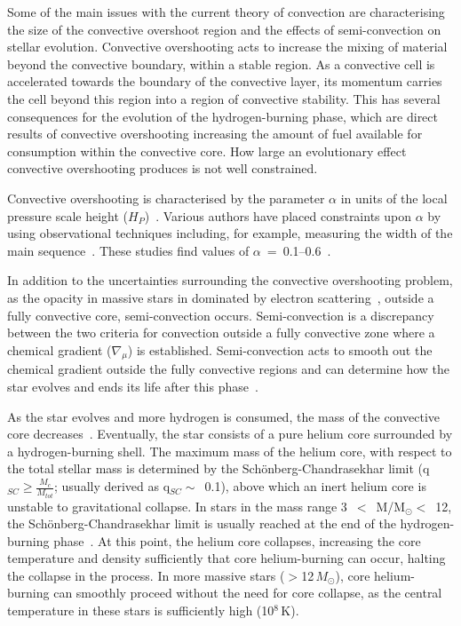 Some of the main issues with the current theory of convection are characterising the size of the convective overshoot region and the effects of semi-convection on stellar evolution.
Convective overshooting acts to increase the mixing of material beyond the convective boundary, within a stable region.
As a convective cell is accelerated towards the boundary of the convective layer, its momentum carries the cell beyond this region into a region of convective stability.
This has several consequences for the evolution of the hydrogen-burning phase, which are direct results of convective overshooting increasing the amount of fuel available for consumption within the convective core.
How large an evolutionary effect convective overshooting produces is not well constrained.

Convective overshooting is characterised by the parameter $\alpha$ in units of the local pressure scale height ($H_{P}$)~\citep{2012sse..book.....K}.
Various authors have placed constraints upon $\alpha$ by using observational techniques including, for example, measuring the width of the main sequence~\citep{Schroder97,Brott11}.
These studies find values of $\alpha$~=~0.1--0.6~\citep[e.g.][who found $\alpha = 0.335$]{Brott11}.

In addition to the uncertainties surrounding the convective overshooting problem, as the opacity in massive stars in dominated by electron scattering~\citep{b:Bohm-vitense92.v3}, outside a fully convective core, semi-convection occurs.
Semi-convection is a discrepancy between the two criteria for convection outside a fully convective zone where a chemical gradient ($\nabla _{\mu}$) is established.
Semi-convection acts to smooth out the chemical gradient outside the fully convective regions and can determine how the star evolves and ends its life after this phase~\citep[e.g.][]{1989A&A...224L..17L}.

As the star evolves and more hydrogen is consumed, the mass of the convective core decreases~\citep{2012sse..book.....K}.
Eventually, the star consists of a pure helium core surrounded by a hydrogen-burning shell.
The maximum mass of the helium core, with respect to the total stellar mass is determined by the Sch\"onberg-Chandrasekhar limit
(q$_{SC}\geq\frac{M_{c}}{M_{tot}}$; usually derived as q$_{SC}\sim$~0.1), above which an inert helium core is unstable to gravitational collapse.
In stars in the mass range 3~$<$~M/M$_{\odot}<$~12, the Sch\"onberg-Chandrasekhar limit is usually reached at the end of the hydrogen-burning phase~\citep{b:SalarisCassisi05}.
At this point, the helium core collapses, increasing the core temperature and density sufficiently that core helium-burning can occur, halting the collapse in the process.
In more massive stars ($>$12\,$M_{\odot}$), core helium-burning can smoothly proceed without the need for core collapse, as the central temperature in these stars is sufficiently high (10$^{8}$\,K).

